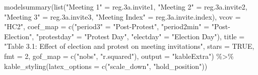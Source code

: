 \documentclass[
  letterpaper,
  DIV=11,
  numbers=noendperiod]{scrartcl}
\newenvironment{Shaded}{\begin{snugshade}}{\end{snugshade}}
\newcommand{\AttributeTok}[1]{\textcolor[rgb]{0.40,0.45,0.13}{#1}}
\newcommand{\ConstantTok}[1]{\textcolor[rgb]{0.56,0.35,0.01}{#1}}
\newcommand{\DecValTok}[1]{\textcolor[rgb]{0.68,0.00,0.00}{#1}}
\newcommand{\FloatTok}[1]{\textcolor[rgb]{0.68,0.00,0.00}{#1}}
\newcommand{\FunctionTok}[1]{\textcolor[rgb]{0.28,0.35,0.67}{#1}}
\newcommand{\NormalTok}[1]{\textcolor[rgb]{0.00,0.23,0.31}{#1}}
\newcommand{\OtherTok}[1]{\textcolor[rgb]{0.00,0.23,0.31}{#1}}
\newcommand{\SpecialCharTok}[1]{\textcolor[rgb]{0.37,0.37,0.37}{#1}}
\newcommand{\StringTok}[1]{\textcolor[rgb]{0.13,0.47,0.30}{#1}}
\begin{document}
\begin{Shaded}
\begin{Highlighting}[]
\FunctionTok{modelsummary}\NormalTok{(}\FunctionTok{list}\NormalTok{(}\StringTok{"Meeting 1"} \OtherTok{=}\NormalTok{ reg}\FloatTok{.3}\NormalTok{a.invite1, }\StringTok{"Meeting 2"} \OtherTok{=}\NormalTok{ reg}\FloatTok{.3}\NormalTok{a.invite2,}
                  \StringTok{"Meeting 3"} \OtherTok{=}\NormalTok{ reg}\FloatTok{.3}\NormalTok{a.invite3, }\StringTok{"Meeting Index"} \OtherTok{=}\NormalTok{ reg}\FloatTok{.3}\NormalTok{a.invite.index),}
             \AttributeTok{vcov =} \StringTok{"HC2"}\NormalTok{,}
             \AttributeTok{coef\_map =} \FunctionTok{c}\NormalTok{(}\StringTok{"period3"} \OtherTok{=} \StringTok{"Post{-}Protest"}\NormalTok{,}
                          \StringTok{"period2min"} \OtherTok{=} \StringTok{"Post{-}Election"}\NormalTok{,}
                          \StringTok{"protestday"} \OtherTok{=} \StringTok{"Protest Day"}\NormalTok{,}
                          \StringTok{"electday"} \OtherTok{=} \StringTok{"Election Day"}\NormalTok{),}
             \AttributeTok{title =} \StringTok{"Table 3.1: Effect of election and protest on meeting invitations"}\NormalTok{,}
             \AttributeTok{stars =} \ConstantTok{TRUE}\NormalTok{, }\AttributeTok{fmt =} \DecValTok{2}\NormalTok{, }\AttributeTok{gof\_map =} \FunctionTok{c}\NormalTok{(}\StringTok{"nobs"}\NormalTok{, }\StringTok{"r.squared"}\NormalTok{),}
             \AttributeTok{output =} \StringTok{"kableExtra"}\NormalTok{) }\SpecialCharTok{\%\textgreater{}\%}
  \FunctionTok{kable\_styling}\NormalTok{(}\AttributeTok{latex\_options =} \FunctionTok{c}\NormalTok{(}\StringTok{"scale\_down"}\NormalTok{, }\StringTok{"hold\_position"}\NormalTok{))}
\end{Highlighting}
\end{Shaded}
\end{document}
